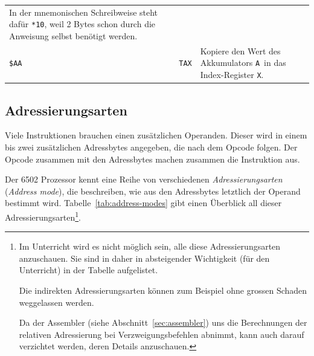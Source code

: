 \documentclass[11pt]{scrartcl}
\newcommand{\xreg}{\texttt{X}}
\newcommand{\acc}{\texttt{A}}
\begin{document}
\begin{longtable}{@{}llp{10cm}@{}}
                                                In der mnemonischen
                                                Schreibweise steht
                                                dafür \texttt{*10}, weil 2
                                                Bytes schon durch die
                                                Anweisung selbst
                                                benötigt werden.\\
    \lstinline!$AA! & \lstinline!TAX! & Kopiere den Wert des
                                        Akkumulators \acc\ in das
                                        Index-Register \xreg. \\
    \bottomrule
  \end{longtable}


\subsection{Adressierungsarten}
\label{sec:address_modes}

Viele Instruktionen brauchen einen zusätzlichen Operanden. Dieser wird
in einem bis zwei zusätzlichen Adressbytes angegeben, die nach dem Opcode
folgen. Der Opcode zusammen mit den Adressbytes machen zusammen die
Instruktion aus.   

Der 6502 Prozessor kennt eine Reihe von verschiedenen
\emph{Adressierungsarten} (\emph{Address mode}), die beschreiben, wie
aus den Adressbytes letztlich der Operand bestimmt wird.
Tabelle~\ref{tab:address-modes} gibt einen Überblick all dieser
Adressierungsarten\footnote{Im Unterricht wird es nicht möglich
  sein, alle diese Adressierungsarten anzuschauen.  Sie sind in daher
  in absteigender Wichtigkeit (für den Unterricht) in der Tabelle
  aufgelistet.

  Die indirekten Adressierungsarten können zum Beispiel ohne grossen
  Schaden weggelassen werden.

  Da der Assembler (siehe Abschnitt~\ref{sec:assembler}) uns die
  Berechnungen der relativen Adressierung bei Verzweigungsbefehlen
  abnimmt, kann auch darauf verzichtet werden, deren Details
  anzuschauen.}.
  
\end{document}
